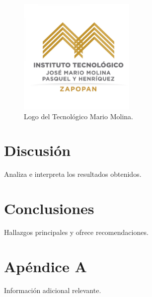 \documentclass[12pt,letterpaper]{report}
\begin{document}
	\begin{figure}[h!]
		\centering
		\includegraphics[width=0.5\textwidth]{imagenes/TecMM.png}
		\caption{Logo del Tecnológico Mario Molina.}
		\label{fig:ejemplo}
	\end{figure}
	
	\chapter{Discusión}
	Analiza e interpreta los resultados obtenidos.
	
	\chapter{Conclusiones}
	Hallazgos principales y ofrece recomendaciones.
	
	
	
	\appendix
	\chapter{Apéndice A}
	Información adicional relevante.
	
\end{document}
